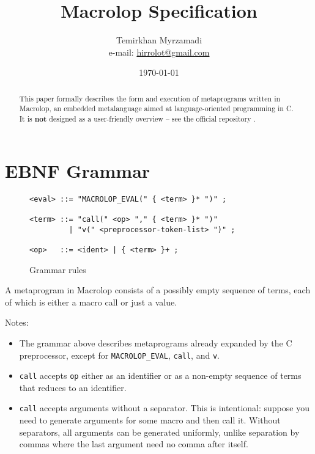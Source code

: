 \documentclass[12pt]{article}
\theoremstyle{break}
\begin{document}
\title{Macrolop Specification}
\date{\today}
\author{Temirkhan Myrzamadi \\ e-mail: \href{mailto:hirrolot@gmail.com}{hirrolot@gmail.com}}
\maketitle

\begin{abstract}
This paper formally describes the form and execution of metaprograms written in Macrolop,
an embedded metalanguage aimed at language-oriented programming in C. It is \textbf{not}
designed as a user-friendly overview -- see the official repository \cite{Macrolop}.
\end{abstract}

\tableofcontents

\newpage

\section{EBNF Grammar}

\begin{figure}[H]
    \caption{Grammar rules}

\begin{verbatim}
<eval> ::= "MACROLOP_EVAL(" { <term> }* ")" ;

<term> ::= "call(" <op> "," { <term> }* ")"
         | "v(" <preprocessor-token-list> ")" ;

<op>   ::= <ident> | { <term> }+ ;
\end{verbatim}

\end{figure}

A metaprogram in Macrolop consists of a possibly empty sequence of terms, each of which
is either a macro call or just a value.

Notes:

\begin{itemize}
    \item The grammar above describes metaprograms already expanded by the C preprocessor,
    except for \texttt{MACROLOP\_EVAL}, \texttt{call}, and \texttt{v}.
    \item \texttt{call} accepts \texttt{op} either as an identifier or as a non-empty
    sequence of terms that reduces to an identifier.
    \item \texttt{call} accepts arguments without a separator. This is intentional: suppose
    you need to generate arguments for some macro and then call it. Without separators, all
    arguments can be generated uniformly, unlike separation by commas where the last argument
    need no comma after itself.
\end{itemize}
\end{document}
